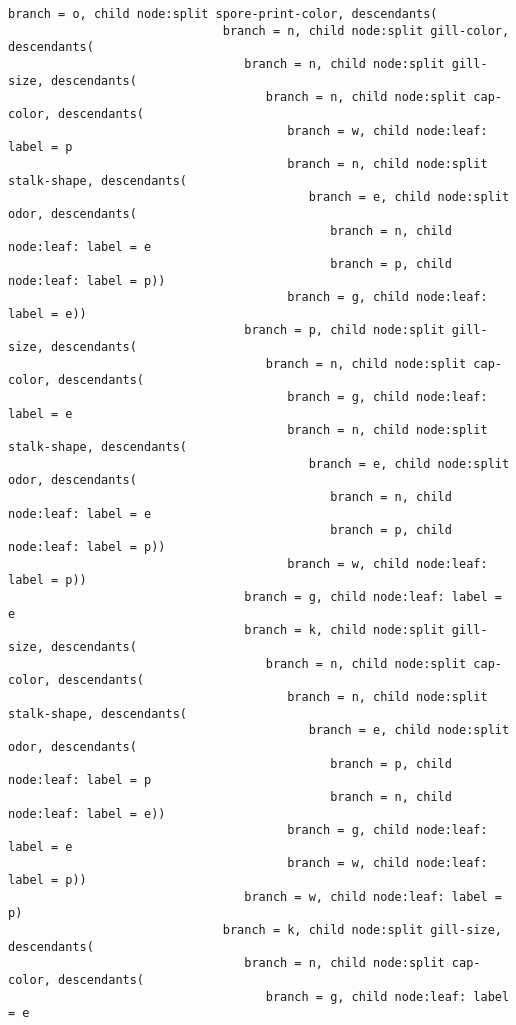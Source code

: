 \documentclass[11pt]{article}
\begin{document}
\begin{Verbatim}[commandchars=\\\{\}]
                           branch = o, child node:split spore-print-color, descendants(
                              branch = n, child node:split gill-color, descendants(
                                 branch = n, child node:split gill-size, descendants(
                                    branch = n, child node:split cap-color, descendants(
                                       branch = w, child node:leaf: label = p
                                       branch = n, child node:split stalk-shape, descendants(
                                          branch = e, child node:split odor, descendants(
                                             branch = n, child node:leaf: label = e
                                             branch = p, child node:leaf: label = p))
                                       branch = g, child node:leaf: label = e))
                                 branch = p, child node:split gill-size, descendants(
                                    branch = n, child node:split cap-color, descendants(
                                       branch = g, child node:leaf: label = e
                                       branch = n, child node:split stalk-shape, descendants(
                                          branch = e, child node:split odor, descendants(
                                             branch = n, child node:leaf: label = e
                                             branch = p, child node:leaf: label = p))
                                       branch = w, child node:leaf: label = p))
                                 branch = g, child node:leaf: label = e
                                 branch = k, child node:split gill-size, descendants(
                                    branch = n, child node:split cap-color, descendants(
                                       branch = n, child node:split stalk-shape, descendants(
                                          branch = e, child node:split odor, descendants(
                                             branch = p, child node:leaf: label = p
                                             branch = n, child node:leaf: label = e))
                                       branch = g, child node:leaf: label = e
                                       branch = w, child node:leaf: label = p))
                                 branch = w, child node:leaf: label = p)
                              branch = k, child node:split gill-size, descendants(
                                 branch = n, child node:split cap-color, descendants(
                                    branch = g, child node:leaf: label = e

\end{Verbatim}
\end{document}
